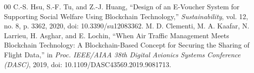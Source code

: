 \documentclass[conference]{IEEEtran}
\begin{document}
\begin{thebibliography}{00}
 C.-S. Hsu, S.-F. Tu, and Z.-J. Huang, ``Design of an E-Voucher System for Supporting Social Welfare Using Blockchain Technology,'' \emph{Sustainability}, vol. 12, no. 8, p. 3362, 2020, doi: 10.3390/su12083362.
 M. D. Clementi, M. A. Kaafar, N. Larrieu, H. Asghar, and E. Lochin, ``When Air Traffic Management Meets Blockchain Technology: A Blockchain-Based Concept for Securing the Sharing of Flight Data,'' in \emph{Proc. IEEE/AIAA 38th Digital Avionics Systems Conference (DASC)}, 2019, doi: 10.1109/DASC43569.2019.9081713.
\end{thebibliography}
\end{document}
